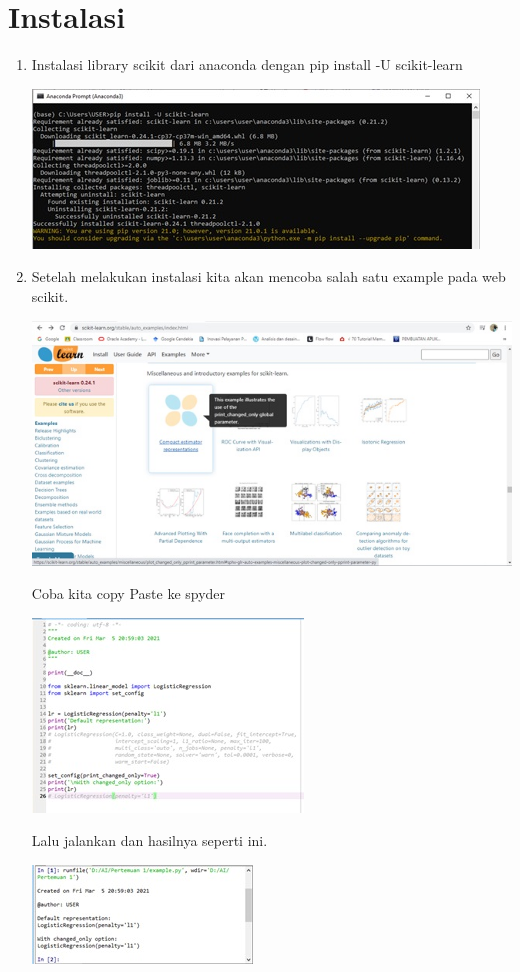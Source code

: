 \section{Instalasi}
\begin{enumerate}
    \item Instalasi library scikit dari anaconda dengan pip install -U scikit-learn
    \begin{center}
    \includegraphics[scale=0.5]{figures/1184085/chapter1/1.jpg}
    \end{center}
    \item Setelah melakukan instalasi kita akan mencoba salah satu example pada web scikit.
    \begin{center}
    \includegraphics[scale=0.75]{figures/1184085/chapter1/2.jpg}
    \end{center}
    Coba kita copy Paste ke spyder
    \begin{center}
    \includegraphics[scale=0.75]{figures/1184085/chapter1/3.jpg}
    \end{center}
    Lalu jalankan dan hasilnya seperti ini.
    \begin{center}
    \includegraphics[scale=0.75]{figures/1184085/chapter1/4.jpg}
    \end{center}
    

\end{enumerate}
